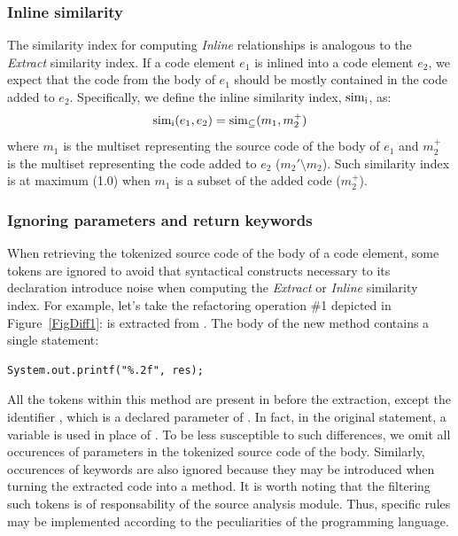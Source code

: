 

\subsubsection{Inline similarity}
\label{SecSimI}

The similarity index for computing \textit{Inline} relationships is analogous to the \textit{Extract} similarity index.
If a code element $e_1$ is inlined into a code element $e_2$, we expect that the code from the body of $e_1$ should be mostly contained in the code added to $e_2$. Specifically, we define the inline similarity index, $\operatorname{sim_{i}}$, as:
\begin{align}
\operatorname{sim_{i}}(e_1, e_2) = \operatorname{sim_{\subseteq}}(m_1, m_2^+)
\end{align}
where $m_1$ is the multiset representing the source code of the body of $e_1$ and $m_2^+$ is the multiset representing the code added to $e_2$ ($m_2' \setminus m_2$). Such similarity index is at maximum (1.0) when $m_1$ is a subset of the added code ($m_2^+$).


\subsubsection{Ignoring parameters and return keywords}

When retrieving the tokenized source code of the body of a code element, some tokens are ignored to avoid that syntactical constructs necessary to its declaration
introduce noise when computing the \textit{Extract} or \textit{Inline} similarity index.
For example, let's take the refactoring operation \#1 depicted in Figure~\ref{FigDiff1}:  is extracted from .
The body of the new method  contains a single statement:
\begin{lstlisting}
System.out.printf("%.2f", res);
\end{lstlisting}
All the tokens within this method are present in  before the extraction, except the identifier , which is a declared parameter of . In fact, in the original statement, a variable  is used in place of . To be less susceptible to such differences, we omit all occurences of parameters in the tokenized source code of the body. Similarly, occurences of  keywords are also ignored because they may be introduced when turning the extracted code into a method.
It is worth noting that the filtering such tokens is of responsability of the source analysis module. Thus, specific rules may be implemented according to the peculiarities of the programming language.
